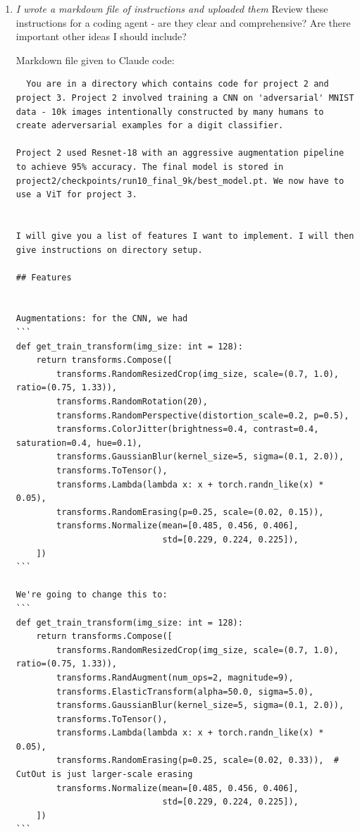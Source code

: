 \documentclass[11pt]{article}
\begin{document}
\begin{enumerate}
\item \textit{I wrote a markdown file of instructions and uploaded them} Review these instructions for a coding agent - are they clear and comprehensive? Are there important other ideas I should include?

Markdown file given to Claude code: \begin{verbatim}
  You are in a directory which contains code for project 2 and project 3. Project 2 involved training a CNN on 'adversarial' MNIST data - 10k images intentionally constructed by many humans to create aderversarial examples for a digit classifier. 

Project 2 used Resnet-18 with an aggressive augmentation pipeline to achieve 95% accuracy. The final model is stored in project2/checkpoints/run10_final_9k/best_model.pt. We now have to use a ViT for project 3.


I will give you a list of features I want to implement. I will then give instructions on directory setup.

## Features


Augmentations: for the CNN, we had 
```
def get_train_transform(img_size: int = 128):
    return transforms.Compose([
        transforms.RandomResizedCrop(img_size, scale=(0.7, 1.0), ratio=(0.75, 1.33)),
        transforms.RandomRotation(20),
        transforms.RandomPerspective(distortion_scale=0.2, p=0.5),
        transforms.ColorJitter(brightness=0.4, contrast=0.4, saturation=0.4, hue=0.1),
        transforms.GaussianBlur(kernel_size=5, sigma=(0.1, 2.0)),
        transforms.ToTensor(),
        transforms.Lambda(lambda x: x + torch.randn_like(x) * 0.05),
        transforms.RandomErasing(p=0.25, scale=(0.02, 0.15)),
        transforms.Normalize(mean=[0.485, 0.456, 0.406],
                             std=[0.229, 0.224, 0.225]),
    ])
```

We're going to change this to:
```
def get_train_transform(img_size: int = 128):
    return transforms.Compose([
        transforms.RandomResizedCrop(img_size, scale=(0.7, 1.0), ratio=(0.75, 1.33)),
        transforms.RandAugment(num_ops=2, magnitude=9),
        transforms.ElasticTransform(alpha=50.0, sigma=5.0),
        transforms.GaussianBlur(kernel_size=5, sigma=(0.1, 2.0)),
        transforms.ToTensor(),
        transforms.Lambda(lambda x: x + torch.randn_like(x) * 0.05),
        transforms.RandomErasing(p=0.25, scale=(0.02, 0.33)),  # CutOut is just larger-scale erasing
        transforms.Normalize(mean=[0.485, 0.456, 0.406],
                             std=[0.229, 0.224, 0.225]),
    ])
```


\end{verbatim}
\end{enumerate}
\end{document}
